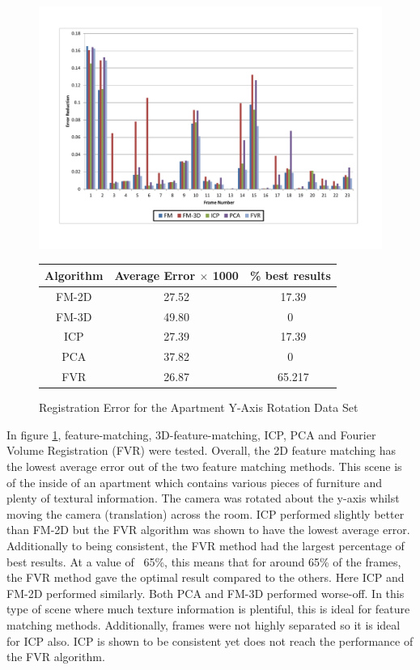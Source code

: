 \begin{figure}
\centering
\includegraphics[width=6in]{images/results/Apartment_Texture_Rotate}
\caption{Registration Error for the Apartment Y-Axis Rotation Data Set}
\label{fig:PET0}

\begin{tabular}{ccc}
\hline
\textbf{Algorithm} & \textbf{Average Error $\times$ 1000} & \textbf{\% best results}\\ \hline
FM-2D	& 27.52 & ~17.39\\
FM-3D	& 49.80 & 0\\
ICP		& 27.39 & ~17.39\\
PCA		& 37.82 & 0\\
FVR		& 26.87 & ~65.217\\
\end{tabular}
\end{figure} 



In figure \ref{fig:PET0}, feature-matching, 3D-feature-matching, ICP, PCA and Fourier Volume Registration (FVR) were tested. Overall, the 2D feature matching has the lowest average error out of the two feature matching methods. This scene is of the inside of an apartment which contains various pieces of furniture and plenty of textural information. The camera was rotated about the y-axis whilst moving the camera (translation) across the room. ICP performed slightly better than FM-2D but the FVR algorithm was shown to have the lowest average error. Additionally to being consistent, the FVR method had the largest percentage of best results. At a value of ~65\%, this means that for around 65\% of the frames, the FVR method gave the optimal result compared to the others. Here ICP and FM-2D performed similarly. Both PCA and FM-3D performed worse-off. In this type of scene where much texture information is plentiful, this is ideal for feature matching methods. Additionally, frames were not highly separated so it is ideal for ICP also. ICP is shown to be consistent yet does not reach the performance of the FVR algorithm. \\


